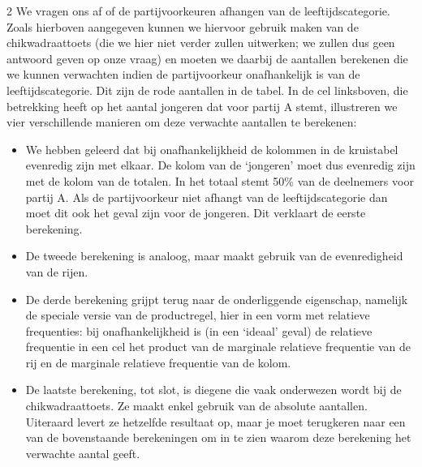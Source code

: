 \begin{multicols} {2}
We vragen ons af of de partijvoorkeuren afhangen van de leeftijdscategorie. Zoals hierboven aangegeven kunnen we hiervoor gebruik maken van de chikwadraattoets (die we hier niet verder zullen uitwerken; we zullen dus geen antwoord geven op onze vraag) en moeten we daarbij de aantallen berekenen die we kunnen verwachten indien de partijvoorkeur onafhankelijk is van de leeftijdscategorie. Dit zijn de rode aantallen in de tabel. In de cel linksboven, die betrekking heeft op het aantal jongeren dat voor partij A stemt, illustreren we vier verschillende manieren om deze verwachte aantallen te berekenen:
\begin{itemize}
    \item We hebben geleerd dat bij onafhankelijkheid de kolommen in de kruistabel evenredig zijn met elkaar. De kolom van de ‘jongeren’ moet dus evenredig zijn met de kolom van de totalen. In het totaal stemt 50\% van de deelnemers voor partij A. Als de partijvoorkeur niet afhangt van de leeftijdscategorie dan moet dit ook het geval zijn voor de jongeren. Dit verklaart de eerste berekening.
    \item De tweede berekening is analoog, maar maakt gebruik van de evenredigheid van de rijen.
    \item De derde berekening grijpt terug naar de onderliggende eigenschap, namelijk de speciale versie van de productregel, hier in een vorm met relatieve frequenties: bij onafhankelijkheid is (in een ‘ideaal’ geval) de relatieve frequentie in een cel het product van de marginale relatieve frequentie van de rij en de marginale relatieve frequentie van de kolom.
    \item De laatste berekening, tot slot, is diegene die vaak onderwezen wordt bij de chikwadraattoets. Ze maakt enkel gebruik van de absolute aantallen. Uiteraard levert ze hetzelfde resultaat op, maar je moet terugkeren naar een van de bovenstaande berekeningen om in te zien waarom deze berekening het verwachte aantal geeft.
\end{itemize}

\end{multicols}

